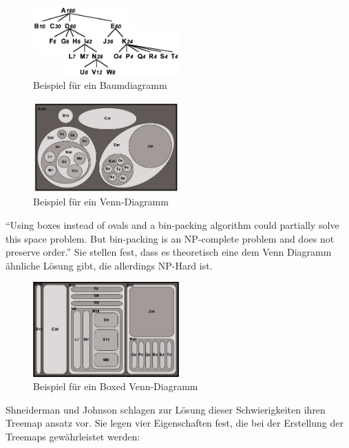 \begin{figure}[ht]
    \centering
    \includegraphics[width=0.5\textwidth]{images/treediagram.png}
    \caption{Beispiel für ein Baumdiagramm}
    \label{fig:baumdiagramm}
\end{figure}

\begin{figure}[ht]
    \centering
    \includegraphics[width=0.5\textwidth]{images/verdiagram.png}
    \caption{Beispiel für ein Venn-Diagramm}
    \label{fig:venndiagram}
\end{figure}

\enquote{Using boxes instead of ovals and a bin-packing algorithm could partially solve this space
problem. But bin-packing is an NP-complete problem and does not preserve order.}\cite[5]{johnson1991tree} Sie stellen fest, dass es theoretisch eine dem Venn Diagramm ähnliche Lösung gibt, die allerdings NP-Hard ist. 

\begin{figure}[ht]
    \centering
    \includegraphics[width=0.5\textwidth]{images/rectVennDiagram.png}
    \caption{Beispiel für ein Boxed Venn-Diagramm}
    \label{fig:rectVennDiagramm}
\end{figure}

Shneiderman und Johnson schlagen zur Lösung dieser Schwierigkeiten ihren Treemap ansatz vor. Sie legen vier Eigenschaften fest, die bei der Erstellung der Treemaps gewährleistet werden:

